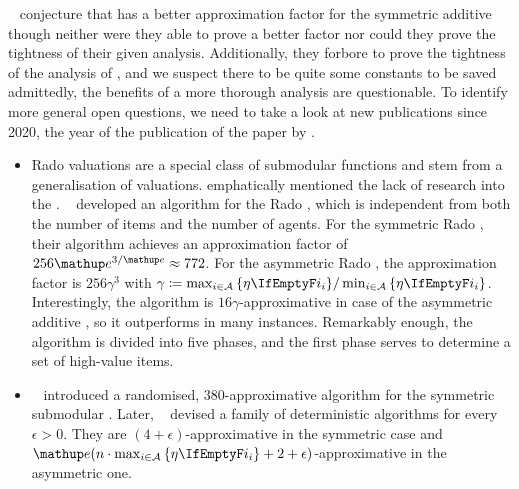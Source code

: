 ~\cite{APNSWuSVþUM} conjecture that \SMatch{} has a better approximation factor for the symmetric additive \NSW{} though neither were they able to prove a better factor nor could they prove the tightness of their given analysis.
Additionally, they forbore to prove the tightness of the analysis of \RepReMatch{}, and we suspect there to be quite some constants to be saved \Dash admittedly, the benefits of a more thorough analysis are questionable.
To identify more general open questions, we need to take a look at new publications since 2020, the year of the publication of the paper by \citeauthor{APNSWuSVþUM}.
\begin{itemize}
	\item
	Rado valuations are a special class of submodular functions and stem from a generalisation of \OXS{} valuations.
	 emphatically mentioned the lack of research into the \OXS{} \NSW.
	~\cite{approximating_nsw_under_rado_valuations} developed an algorithm for the Rado \NSW, which is independent from both the number of items and the number of agents.
	For the symmetric Rado \NSW, their algorithm achieves an approximation factor of \(256 \euler^{3/\euler} \approx 772\).
	For the asymmetric Rado \NSW, the approximation factor is \(256 \gamma^3\) with \(\gamma \coloneq \max_{i \in \agents} \,\braces{\weight} / \min_{i \in \agents} \,\braces{\weight}\).
	Interestingly, the algorithm is \(16 \gamma\)-approximative in case of the asymmetric additive \NSW, so it outperforms \SMatch{} in many instances.
	Remarkably enough, the algorithm is divided into five phases, and the first phase serves to determine a set of high-value items.

	\item
	\citeauthor{a_constfactor_approx_algo_for_nsw_with_submod_valuations}~\cite{a_constfactor_approx_algo_for_nsw_with_submod_valuations} introduced a randomised, \(380\)-approximative algorithm for the symmetric submodular \NSW.
	Later, \citeauthor{approx_nsw_by_matching_and_local_search}~\cite{approx_nsw_by_matching_and_local_search} devised a family of deterministic algorithms for every \(\epsilon > 0\).
	They are \((4+\epsilon)\)-approximative in the symmetric case and \(\euler(n \cdot \max_{i \in \agents} \,\braces{\weight} + 2 + \epsilon)\)-approximative in the asymmetric one.


\end{itemize}
